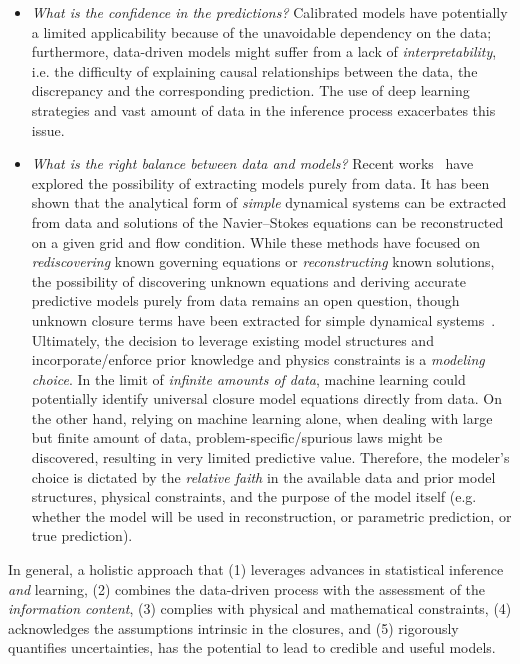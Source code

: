 \documentclass[a4paper]{ar-1col}
\begin{document}
\begin{itemize}
\item {\it What is the confidence in the predictions?} Calibrated  models have potentially a limited applicability because of the unavoidable dependency on the data; furthermore, data-driven models might suffer  from  a lack of {\it interpretability}, i.e. the difficulty of explaining   causal relationships between the data, the discrepancy and the corresponding prediction. 
The use of deep learning strategies and vast amount of data in the inference process exacerbates this issue.  
\item {\it What is the right balance between data and models?} Recent works~\citep{schmidt2009distilling,brunton2016discovering,raissi2017physics} have explored the possibility of extracting models purely from data.  It has been  shown that the analytical form of {\em simple} dynamical systems can be  extracted from data and solutions of the Navier--Stokes equations can be reconstructed on a given grid and flow condition. While these methods have focused on {\em rediscovering} known governing equations or {\em reconstructing} known solutions, the possibility of discovering unknown equations and deriving accurate predictive models purely from data remains an open question, though unknown closure terms have been extracted for simple dynamical systems~\citep{pan2018data}. 
 Ultimately, the decision to leverage existing model structures and  incorporate/enforce prior knowledge and physics constraints is a \emph{modeling choice}.
In the limit of \emph{infinite amounts of data}, machine learning could potentially identify universal closure model equations directly from data. On the other hand, relying on machine learning alone, when dealing with large but finite amount of data, problem-specific/spurious laws might be discovered,
resulting in very limited predictive value.
Therefore,  the modeler's choice is dictated by the \emph{relative faith} in the available data and prior model structures, physical constraints, and the purpose of the model itself (e.g. whether the model will be used in reconstruction, or parametric prediction, or true prediction).
 \end{itemize}


In general, a holistic approach that (1) leverages  advances in statistical inference {\em and} learning, (2) combines the data-driven process with the assessment of the {\it information content}, (3) complies with physical and mathematical constraints, (4) acknowledges the assumptions intrinsic
in the closures,  and (5) rigorously quantifies   uncertainties, has the potential to lead to credible and useful models.
\end{document}
